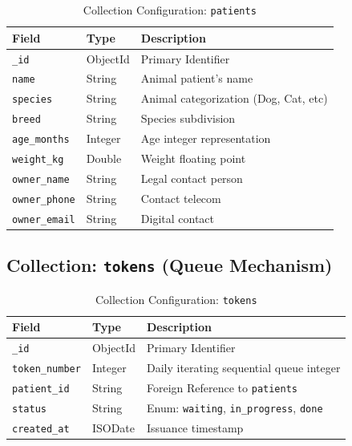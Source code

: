 \documentclass[a4paper,12pt]{report}
\begin{document}
\begin{table}[H]
\centering
\caption{Collection Configuration: \texttt{patients}}
\vspace{6pt}
\renewcommand{\arraystretch}{1.3}
\begin{tabular}{|l|l|p{7.5cm}|}
\hline
\textbf{Field}         & \textbf{Type}  & \textbf{Description} \\
\hline
\texttt{\_id}          & ObjectId       & Primary Identifier \\
\texttt{name}          & String         & Animal patient's name \\
\texttt{species}       & String         & Animal categorization (Dog, Cat, etc) \\
\texttt{breed}         & String         & Species subdivision \\
\texttt{age\_months}   & Integer        & Age integer representation \\
\texttt{weight\_kg}    & Double         & Weight floating point \\
\texttt{owner\_name}   & String         & Legal contact person \\
\texttt{owner\_phone}  & String         & Contact telecom \\
\texttt{owner\_email}  & String         & Digital contact \\
\hline
\end{tabular}
\label{tab:col_patients}
\end{table}

\subsection{Collection: \texttt{tokens} (Queue Mechanism)}

\begin{table}[H]
\centering
\caption{Collection Configuration: \texttt{tokens}}
\vspace{6pt}
\renewcommand{\arraystretch}{1.3}
\begin{tabular}{|l|l|p{7.5cm}|}
\hline
\textbf{Field}        & \textbf{Type}  & \textbf{Description} \\
\hline
\texttt{\_id}         & ObjectId       & Primary Identifier \\
\texttt{token\_number}& Integer        & Daily iterating sequential queue integer \\
\texttt{patient\_id}  & String         & Foreign Reference to \texttt{patients} \\
\texttt{status}       & String         & Enum: \texttt{waiting}, \texttt{in\_progress}, \texttt{done} \\
\texttt{created\_at}  & ISODate        & Issuance timestamp \\
\hline
\end{tabular}
\label{tab:col_tokens}
\end{table}
\end{document}
